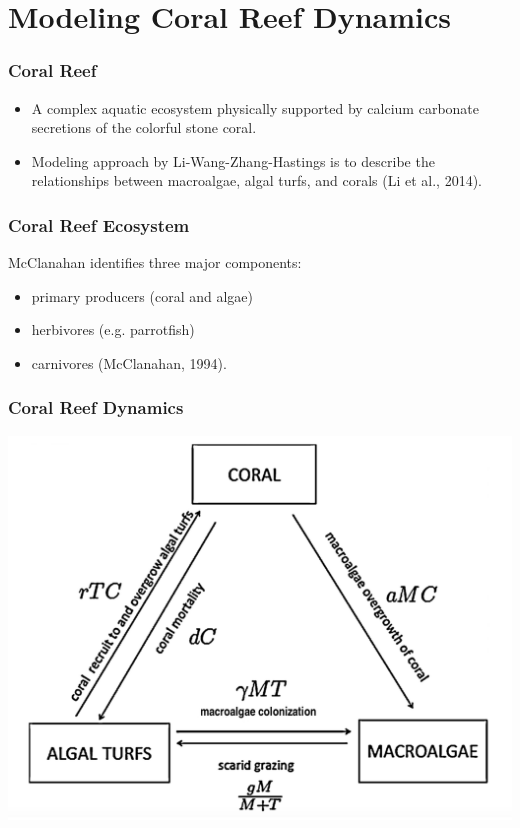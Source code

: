 
\section{Modeling Coral Reef Dynamics}

\begin{frame}
\frametitle{Coral Reef}
\begin{itemize}
\item A complex aquatic ecosystem physically supported by calcium carbonate secretions of the colorful stone coral. \\
\item Modeling approach by Li-Wang-Zhang-Hastings is to describe the relationships between macroalgae, algal turfs, and corals (Li et al., 2014).
\end{itemize}
\end{frame}

\begin{frame}
\frametitle{Coral Reef Ecosystem} 

McClanahan identifies three major components:
\begin{itemize}
\item primary producers (coral and algae)\\
\item herbivores (e.g. parrotfish)\\
\item carnivores (McClanahan, 1994).
\end{itemize}
\end{frame}

\begin{frame}
\frametitle{Coral Reef Dynamics}
\includegraphics[scale=.175]{./coral-reef-triangle.png}
\end{frame}

